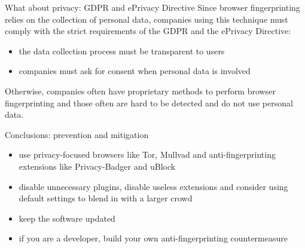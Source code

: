 \begin{frame}{What about privacy: GDPR and ePrivacy Directive}
  Since browser fingerprinting relies on the collection of personal data, companies using this technique must comply with the strict requirements of the GDPR and the ePrivacy Directive:
  \begin{itemize}
    \item the data collection process must be transparent to users
    \item companies must ask for consent when personal data is involved
  \end{itemize}
  Otherwise, companies often have proprietary methods to perform browser fingerprinting and those often are hard to be detected and do not use personal data.
\end{frame}

\begin{frame}{Conclusions: prevention and mitigation}
  \begin{itemize}
    \item use privacy-focused browsers like Tor, Mullvad and anti-fingerprinting extensions like Privacy-Badger and uBlock
          \vspace{0.5cm}
    \item disable unnecessary plugins, disable useless extensions and consider using default settings to blend in with a larger crowd
          \vspace{0.5cm}
    \item keep the software updated
          \vspace{0.5cm}
    \item if you are a developer, build your own anti-fingerprinting countermeasure
  \end{itemize}
\end{frame}